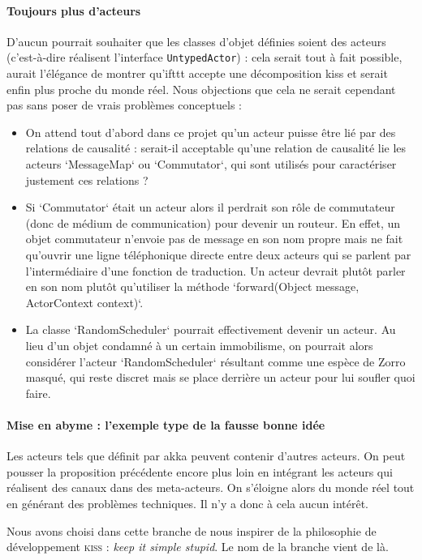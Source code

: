 \documentclass[11pt]{article}
\begin{document}
\paragraph{Toujours plus d'acteurs} D'aucun pourrait souhaiter que les classes d'objet définies soient des acteurs (c'est-à-dire réalisent l'interface \texttt{UntypedActor}) : cela serait tout à fait possible, aurait l'élégance de montrer qu'ifttt accepte une décomposition kiss et serait enfin plus proche du monde réel. Nous objections que cela ne serait cependant pas sans poser de vrais problèmes conceptuels :
\begin{itemize}
\item On attend tout d'abord dans ce projet qu'un acteur puisse être lié par des relations de causalité : serait-il acceptable qu'une relation de causalité lie les acteurs `MessageMap` ou `Commutator`, qui sont utilisés pour caractériser justement ces relations ?
\item Si `Commutator` était un acteur alors il perdrait son rôle de commutateur (donc de médium de communication) pour devenir un routeur. En effet, un objet commutateur n'envoie pas de message en son nom propre mais ne fait qu'ouvrir une ligne téléphonique directe entre deux acteurs qui se parlent par l'intermédiaire d'une fonction de traduction. Un acteur devrait plutôt parler en son nom plutôt qu'utiliser la méthode `forward(Object message, ActorContext context)`.
\item La classe `RandomScheduler` pourrait effectivement devenir un acteur. Au lieu d'un objet condamné à un certain immobilisme, on pourrait alors considérer l'acteur `RandomScheduler` résultant comme une espèce de Zorro masqué, qui reste discret mais se place derrière un acteur pour lui soufler quoi faire.
\end{itemize}

\paragraph{Mise en abyme : l'exemple type de la fausse bonne idée} Les acteurs tels que définit par akka peuvent contenir d'autres acteurs. On peut pousser la proposition précédente encore plus loin en intégrant les acteurs qui réalisent des canaux dans des meta-acteurs. On s'éloigne alors du monde réel tout en générant des problèmes techniques. Il n'y a donc à cela aucun intérêt.

Nous avons choisi dans cette branche de nous inspirer de la \og philosophie de développement \fg{} \textsc{kiss} : \textsl{keep it simple stupid}. Le nom de la branche vient de là.
\end{document}
